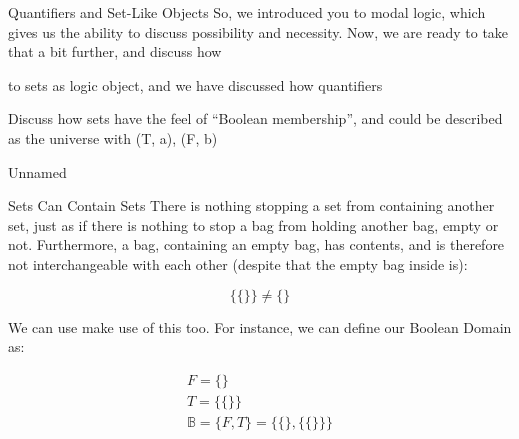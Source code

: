 \begin{part}{Quantifiers and Set-Like Objects}
    So, we introduced you to modal logic, which gives us the ability to discuss possibility and necessity. Now, we are ready to take that a bit further, and discuss how 
    
    to sets as logic object, and we have discussed how quantifiers 
    
    Discuss how sets have the feel of ``Boolean membership'', and could be described as the universe with (T, a), (F, b)
    \begin{chapter}{Unnamed}
        \begin{section}{Sets Can Contain Sets}
            There is nothing stopping a set from containing another set, just as if there is nothing to stop a bag from holding another bag, empty or not. Furthermore, a bag, containing an empty bag, has contents, and is therefore not interchangeable with each other (despite that the empty bag inside is):
            
            $$
                \{ \{\} \} \neq \{ \}
            $$
            
            We can use make use of this too. For instance, we can define our Boolean Domain as:
            
            \begin{gather*}
                F = \{ \} \\
                T = \{ \{ \} \} \\
                \mathbb{B} = \{F, T\} = \{\{\}, \{ \{ \} \} \}
            \end{gather*}
            

\end{section}
\end{chapter}
\end{part}
